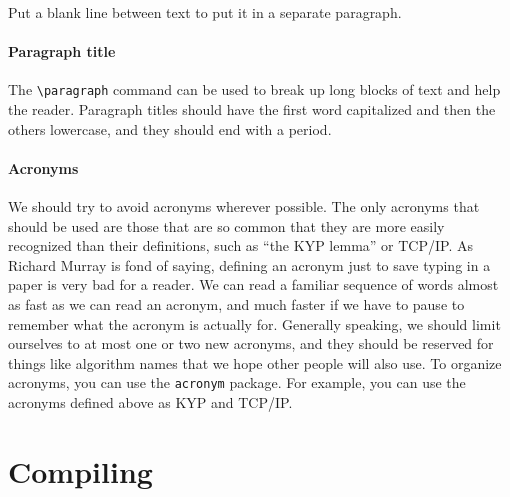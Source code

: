 Put a blank line between text to put it in a separate paragraph.

\paragraph{Paragraph title}

The \verb|\paragraph| command can be used to break up long blocks of text and help the reader. Paragraph titles should have the first word capitalized and then the others lowercase, and they should end with a period.

\paragraph{Acronyms}

We should try to avoid acronyms wherever possible. The only acronyms that should be used are those that are so common that they are more easily recognized than their definitions, such as ``the \ac{KYP} lemma'' or \ac{TCP/IP}. As Richard Murray is fond of saying, defining an acronym just to save typing in a paper is very bad for a reader. We can read a familiar sequence of words almost as fast as we can read an acronym, and much faster if we have to pause to remember what the acronym is actually for. Generally speaking, we should limit ourselves to at most one or two new acronyms, and they should be reserved for things like algorithm names that we hope other people will also use. To organize acronyms, you can use the \texttt{acronym} package. For example, you can use the acronyms defined above as \ac{KYP} and \ac{TCP/IP}.


\section{Compiling}

